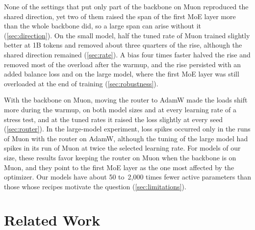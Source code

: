 \documentclass[11pt, a4paper]{article}
\begin{document}
None of the settings that put only part of the backbone on Muon reproduced the shared direction, yet two of them raised the span of the first MoE layer more than the whole backbone did, so a large span can arise without it (\cref{sec:direction}). On the small model, half the tuned rate of Muon trained slightly better at 1B tokens and removed about three quarters of the rise, although the shared direction remained (\cref{sec:rate}). A bias four times faster halved the rise and removed most of the overload after the warmup, and the rise persisted with an added balance loss and on the large model, where the first MoE layer was still overloaded at the end of training (\cref{sec:robustness}).

With the backbone on Muon, moving the router to AdamW made the loads shift more during the warmup, on both model sizes and at every learning rate of a stress test, and at the tuned rates it raised the loss slightly at every seed (\cref{sec:router}). In the large-model experiment, loss spikes occurred only in the runs of Muon with the router on AdamW, although the tuning of the large model had spikes in its run of Muon at twice the selected learning rate. For models of our size, these results favor keeping the router on Muon when the backbone is on Muon, and they point to the first MoE layer as the one most affected by the optimizer. Our models have about 50 to~2,000 times fewer active parameters than those whose recipes motivate the question (\cref{sec:limitations}).

\section{Related Work}
\label{sec:related}
\end{document}
